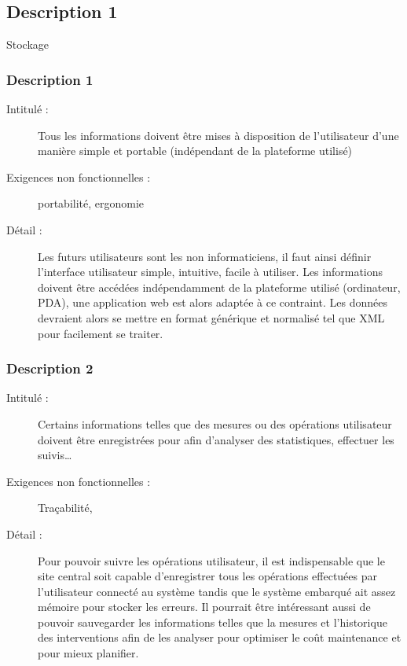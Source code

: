 \subsection {Description 1}Stockage
 \subsubsection {Description 1}
\begin{description}
           \item[Intitulé :] Tous les informations doivent être mises à disposition de l'utilisateur d'une manière simple et portable (indépendant de la plateforme utilisé)
           \item[Exigences non fonctionnelles :] portabilité,  ergonomie
           \item[Détail :] Les futurs utilisateurs sont les non informaticiens, il faut ainsi définir l’interface utilisateur simple, intuitive, facile à utiliser. Les informations doivent être accédées indépendamment de la plateforme utilisé (ordinateur, PDA), une application web est alors adaptée à ce contraint.  Les données devraient alors se mettre en format générique et normalisé tel que XML pour facilement se traiter.
\end{description}

\subsubsection {Description 2}
\begin{description}
           \item[Intitulé :] Certains informations telles que des mesures ou des opérations utilisateur doivent être enregistrées pour afin d’analyser des statistiques, effectuer les suivis… 
           \item[Exigences non fonctionnelles :] Traçabilité, 
           \item[Détail :] Pour pouvoir suivre les opérations utilisateur, il est indispensable que le site central soit capable d’enregistrer tous les opérations effectuées par l’utilisateur connecté au système tandis que le système embarqué ait assez mémoire pour stocker les erreurs. Il pourrait être intéressant aussi de pouvoir sauvegarder les informations telles que la mesures et l’historique des interventions afin de les analyser pour optimiser le coût maintenance et pour mieux planifier. 
\end{description}

